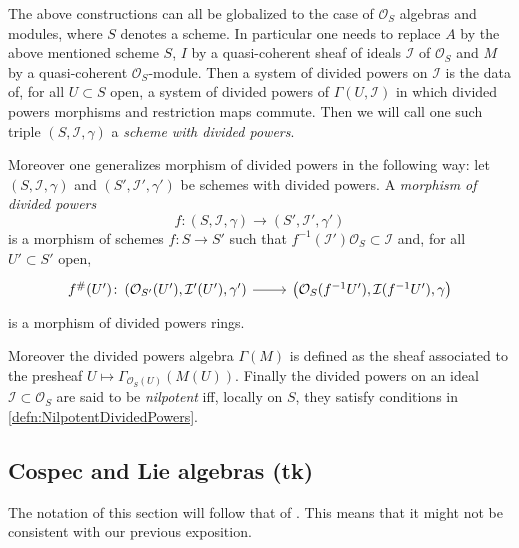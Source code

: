 \documentclass[../Main]{subfiles}
\begin{document}
\begin{rem}[]\label{rem:DividedPowersSheaf}
	The above constructions can all be globalized to the case of
	$\mathcal{O}_S$ algebras and modules, where $S$ denotes a scheme.
	In particular one needs to replace $A$ by the above mentioned scheme $S$,
	$I$ by a quasi-coherent sheaf of ideals $\mathcal{I}$ of $\mathcal{O}_S$ and
	$M$ by a quasi-coherent $\mathcal{O}_S$-module.
	Then a system of divided powers on $\mathcal{I}$ is the data
	of, for all $U \subset S$ open, a system of divided powers of
	$\Gamma(U,\mathcal{I})$ in which divided powers morphisms and restriction
	maps commute.
	Then we will call one such triple $\left(S, \mathcal{I}, \gamma\right)$
	a {\em scheme with divided powers}.

	Moreover one generalizes morphism of divided powers in the following way:
	let $\left(S, \mathcal{I}, \gamma\right)$ and $\left(S', \mathcal{I}', \gamma'\right)$
	be schemes with divided powers.
	A {\em morphism of divided powers}
	\begin{equation*}
	f\colon \left(S, \mathcal{I}, \gamma\right) \to 
	\left(S', \mathcal{I}', \gamma'\right)
	\end{equation*}
	is a morphism of schemes
	$f\colon S \to S'$ such that
	$f^{-1}(\mathcal{I}') \mathcal{O}_S \subset \mathcal{I}$
	and, for all $U' \subset S'$ open,
	\begin{equation*}
	\begin{tikzcd}[row sep = 0ex
		,/tikz/column 1/.append style={anchor=base east}
		,/tikz/column 2/.append style={anchor=base west}]
		f^\#(U')\colon 
		\left(\mathcal{O}_{S'}(U'), \mathcal{I}'(U'), \gamma'\right)
		\arrow[r, "", rightarrow] &
		\left(\mathcal{O}_{ S }(f^{-1}U'), \mathcal{I}(f^{-1}U'), \gamma\right)
	\end{tikzcd}
	\end{equation*} 
	is a morphism of divided powers rings.

	Moreover the divided powers algebra $\Gamma(M)$ is defined
	as the sheaf associated to the presheaf 
	$U \mapsto \Gamma_{\mathcal{O}_S(U)}(M(U))$.
	Finally the divided powers on an ideal $\mathcal{I} \subset \mathcal{O}_S$
	are said to be {\em nilpotent} iff,
	locally on $S$, they satisfy conditions in \cref{defn:NilpotentDividedPowers}.
\end{rem}


\subsection{Cospec and Lie algebras (tk)}
The notation of this section will follow that of \cite[Capther III]{Messing}.
This means that it might not be consistent with our previous exposition.
\end{document}
